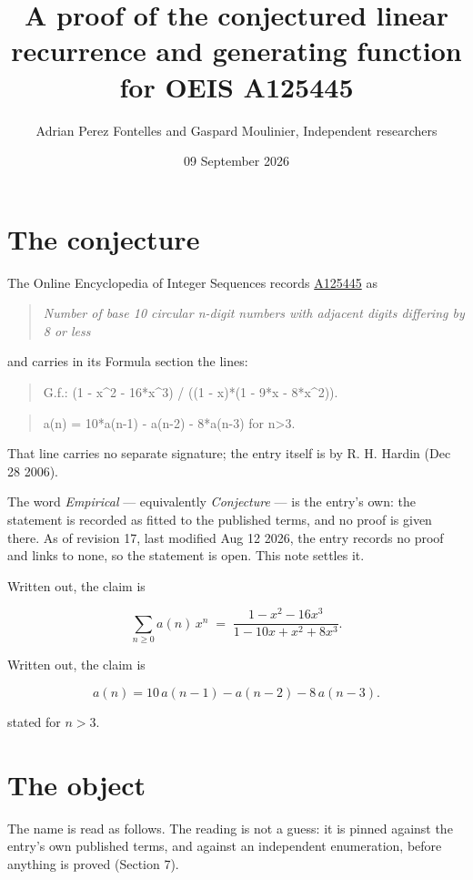 \documentclass[11pt]{article}
\title{A proof of the conjectured linear recurrence and generating function for OEIS A125445}
\author{Adrian Perez Fontelles and Gaspard Moulinier, Independent researchers}
\date{09 September 2026}
\theoremstyle{definition}
\begin{document}
\maketitle
\section{The conjecture}

The Online Encyclopedia of Integer Sequences records \href{https://oeis.org/A125445}{A125445} as

\begin{quote}\itshape Number of base 10 circular n-digit numbers with adjacent digits differing by 8 or less\end{quote}

and carries in its Formula section the lines:

\begin{quote}\ttfamily G.f.: (1 - x\textasciicircum{}2 - 16*x\textasciicircum{}3) / ((1 - x)*(1 - 9*x - 8*x\textasciicircum{}2)).\end{quote}

\begin{quote}\ttfamily a(n) = 10*a(n-1) - a(n-2) - 8*a(n-3) for n>3.\end{quote}

That line carries no separate signature; the entry itself is by R. H. Hardin (Dec 28 2006).

The word {\itshape Empirical} --- equivalently {\itshape Conjecture} --- is the entry's own: the statement is recorded as fitted to the published terms, and no proof is given there. As of revision 17, last modified Aug 12 2026, the entry records no proof and links to none, so the statement is open. This note settles it.

Written out, the claim is

\[\sum_{n \ge 0} a(n)\,x^n \;=\; \frac{1 - x^{2} - 16x^{3}}{1 - 10x + x^{2} + 8x^{3}}.\]

Written out, the claim is

\[a(n) = 10\,a(n-1) - a(n-2) - 8\,a(n-3).\]

stated for $n > 3$.

\section{The object}

The name is read as follows. The reading is not a guess: it is pinned against the entry's own published terms, and against an independent enumeration, before anything is proved (Section 7).
\end{document}
